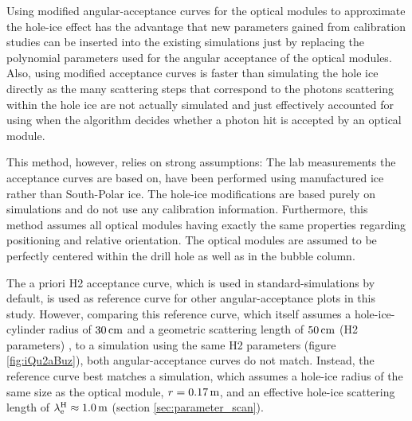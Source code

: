 Using modified angular-acceptance curves for the optical modules to
approximate the hole-ice effect has the advantage that new parameters
gained from calibration studies can be inserted into the existing
simulations just by replacing the polynomial parameters used for the
angular acceptance of the optical modules. Also, using modified
acceptance curves is faster than simulating the hole ice directly as the
many scattering steps that correspond to the photons scattering within
the hole ice are not actually simulated and just effectively accounted
for using when the algorithm decides whether a photon hit is accepted by
an optical module.

This method, however, relies on strong assumptions: The lab measurements
the acceptance curves are based on, have been performed using
manufactured ice rather than South-Polar ice. The hole-ice modifications
are based purely on simulations and do not use any \icecube calibration
information. \cite{icepaper} Furthermore, this method assumes all
optical modules having exactly the same properties regarding positioning
and relative orientation. The optical modules are assumed to be
perfectly centered within the drill hole as well as in the bubble
column.

The a priori H2 acceptance curve, which is used in
standard-\clsim simulations by default, is used as reference curve for
other angular-acceptance plots in this study. However, comparing this
reference curve, which itself assumes a hole-ice-cylinder radius of
\(30\text{\,cm}\) and a geometric scattering length of \(50\text{\,cm}\) (H2 parameters)
\cite{icemodelsdata}, to a \clsim simulation using the same H2
parameters (figure \ref{fig:iQu2aBuz}), both angular-acceptance curves
do not match. Instead, the reference curve best matches a
\clsim simulation, which assumes a hole-ice radius of the same size as
the optical module, \(r = 0.17\text{\,m}\), and an effective hole-ice scattering
length of \(\lambda_\text{e}^\text{H} \approx 1.0\text{\,m}\) (section
\ref{sec:parameter_scan}).

